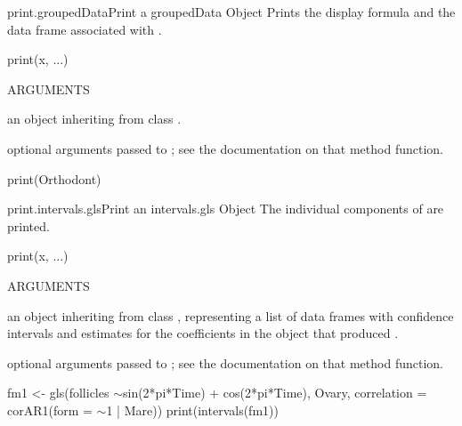 \documentclass[pdftex]{article} \usepackage{url,graphicx}
\renewcommand{\Twiddle}{\mbox{\(\sim\)}}
\begin{document}
\begin{Helpfile}{print.groupedData}{Print a groupedData Object}
Prints the display formula and the data frame associated with
.
\begin{Example}
print(x, ...)
\end{Example}
\begin{Argument}{ARGUMENTS}
\item[\Co{x:}]
an object inheriting from class .
\item[\Co{...:}]
optional arguments passed to ; see
the documentation on that method function.
\end{Argument}
\need 15pt
\vspace{-16pt} 
\begin{Example}
print(Orthodont)
\end{Example}
\end{Helpfile}
\begin{Helpfile}{print.intervals.gls}{Print an intervals.gls Object}
The individual components of  are printed.
\begin{Example}
print(x, ...)
\end{Example}
\begin{Argument}{ARGUMENTS}
\item[\Co{x:}]
an object inheriting from class ,
representing a list of data frames with confidence intervals and
estimates for the coefficients in the  object that produced
.
\item[\Co{...:}]
optional arguments passed to ; see
the documentation on that method function.
\end{Argument}
\need 15pt
\vspace{-16pt} 
\begin{Example}
fm1 <- gls(follicles \Twiddle sin(2*pi*Time) + cos(2*pi*Time), Ovary,
           correlation = corAR1(form = \Twiddle 1 | Mare))
print(intervals(fm1))
\end{Example}
\end{Helpfile}
\end{document}
